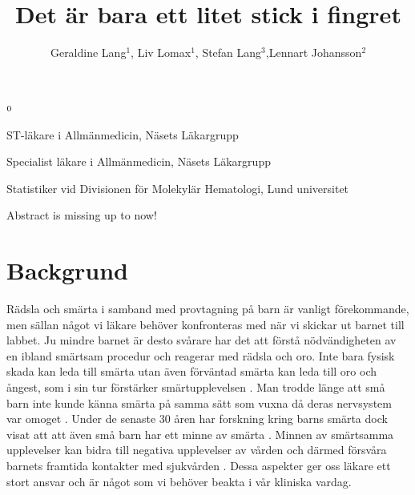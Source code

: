 \documentclass[12pt,twocolumn]{article}
\title{Det \"ar bara ett litet stick i fingret}
\author{Geraldine Lang$^{1}$, Liv Lomax$^1$, Stefan Lang$^3$,Lennart
Johansson$^2$}
\newenvironment{affiliations}{%
    \setcounter{enumi}{1}%
    \setlength{\parindent}{0in}%
    \slshape\sloppy%
    \begin{list}{\upshape$^{\arabic{enumi}}$}{%
        \usecounter{enumi}%
        \setlength{\leftmargin}{0in}%
        \setlength{\topsep}{0in}%
        \setlength{\labelsep}{0in}%
        \setlength{\labelwidth}{0in}%
        \setlength{\listparindent}{0in}%
        \setlength{\itemsep}{0ex}%
        \setlength{\parsep}{0in}%
        }
    }{\end{list}\par\vspace{12pt}}
\renewenvironment{abstract}{%
    \setlength{\parindent}{0in}%
    \setlength{\parskip}{0in}%
    \bfseries%
    }{\par\vspace{-6pt}}
\begin{document}
\onecolumn

\maketitle

\begin{affiliations}
 \item ST-l\"akare i Allm\"anmedicin, N\"asets L\"akargrupp
 \item Specialist l\"akare i Allm\"anmedicin, N\"asets L\"akargrupp
 \item Statistiker vid Divisionen f\"or Molekyl\"ar Hematologi, Lund universitet
\end{affiliations}

\begin{abstract}
Abstract is missing up to now!
\end{abstract}


\twocolumn

\newpage

\section{Backgrund}


R\"adsla och sm\"arta i samband med provtagning p\r{a} barn \"ar vanligt
f\"orekommande, men s\"allan n\r{a}got vi l\"akare beh\"over konfronteras med
n\"ar vi skickar ut barnet till labbet. Ju mindre barnet \"ar desto sv\r{a}rare
har det att f\"orst\r{a} n\"odv\"andigheten av en ibland sm\"artsam procedur och
reagerar med r\"adsla och oro. Inte bara fysisk skada kan leda till sm\"arta
utan \"aven f\"orv\"antad sm\"arta kan leda till oro och \r{a}ngest, som i sin
tur f\"orst\"arker sm\"artupplevelsen \cite{Carverius2014}.
Man trodde l\"ange att sm\r{a} barn inte kunde k\"anna sm\"arta p\r{a} samma
s\"att som vuxna d\r{a} deras nervsystem var omoget \cite{Rey1993}. Under de
senaste 30
\r{a}ren har forskning kring barns sm\"arta dock visat att att \"aven sm\r{a}
barn har ett minne av sm\"arta \cite{Anand2007,Fitzgerald2001,Schechter2003}.
Minnen av sm\"artsamma upplevelser kan bidra till negativa upplevelser av
v\r{a}rden och d\"armed f\"orsv\r{a}ra barnets framtida kontakter med
sjukv\r{a}rden \cite{vBayer2004}. Dessa aspekter ger oss l\"akare ett stort
ansvar och \"ar n\r{a}got som vi beh\"over beakta i v\r{a}r kliniska vardag.
\end{document}
